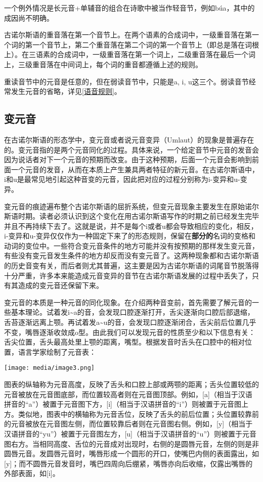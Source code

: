 一个例外情况是长元音+单辅音的组合在诗歌中被当作轻音节，例如búa，其中的成因尚不明确。

古诺尔斯语的重音落在第一个音节上。在两个语素的合成词中，一级重音落在第一个词的第一个音节上，第二个重音落在第二个词的第一个音节上（即总是落在词根上）。在三语素的合成词中，一级重音落在第一个词上，二级重音落在最后一个词上，三级重音落在中间词上，每个词的重音都遵循上述的规则。

重读音节中的元音是任意的，但在弱读音节中，只能是a, i,
u这三个。弱读音节经常发生元音的省略，详见\ref{语音规则}。

\subsection{变元音}\label{变元音}

在古诺尔斯语的形态学中，变元音或者说元音变异（Umlaut）的现象是普遍存在的。变元音指的是两个元音同化的过程。具体来说，一个给定音节中元音的发音会因为说话者对下一个元音的预期而改变。由于这种预期，后面一个元音会影响到前面一个元音的发音，从而在本质上产生兼具两者特征的新元音。在古诺尔斯语中，i和u是最常见地引起这种音变的元音，因此把对应的过程分别称为i-变异和u-变异。

变元音的痕迹遍布整个古诺尔斯语的屈折系统，但变元音现象主要发生在原始诺尔斯语时期。读者必须认识到这个变化在用古诺尔斯语写作的时期之前已经发生完毕并且不再持续下去了。这就是说，并不是每个i或者u都会导致相应的变化，相反，i-变异和u-变异仅仅作为一种固定下来了的形态规则，保留在\textbf{部分的}名词的变格和动词的变位中。一些符合变元音条件的地方可能并没有按预期的那样发生变元音，有些没有变元音发生条件的地方却反而没有变元音了。这两种现象都和古诺尔斯语的历史音变有关，而后者则尤其普遍，这主要是因为古诺尔斯语的词尾音节脱落得十分严重，许多本来能造成元音变异的音节在古诺尔斯语发展的过程中丢失了，只有其造成的变元音还保留下来。

变元音的本质是一种元音的同化现象。在介绍两种音变前，首先需要了解元音的一些基本理论。试着发i\textasciitilde a的音，会发现口腔逐渐打开，舌尖逐渐向口腔后部退缩，舌苔逐渐远离上颚。再试着发a\textasciitilde u的音，会发现口腔逐渐闭合，舌尖前后位置几乎不变，嘴唇逐渐收敛成o型。由此我们可以发现元音的性质至少和以下信息有关：舌尖位置，舌头最高处里上颚的距离，嘴型。根据发音时舌头在口腔中的相对位置，语言学家绘制了元音表：

\texttt{[image: media/image3.png]}

图表的纵轴称为元音高度，反映了舌头和口腔上部或两颚的距离；舌头位置较低的元音被放在元音图底部，而位置较高者则在元音图顶部。例如，{[}a{]}（相当于汉语拼音的``a''）被置于元音图下方，{[}i{]}（相当于汉语拼音的``i''）则被置于元音图上方。类似地，图表中的横轴称为元音舌位，反映了舌头的前后位置；头位置较靠前的元音被放在元音图左侧，而位置较靠后者则在元音图右侧。例如，{[}y{]}（相当于汉语拼音的``yu''）被置于元音图左方，{[}u{]}（相当于汉语拼音的``u''）则被置于元音图右方。当相同高度、舌位的元音成对出现时，右侧的是圆唇元音，左侧的则是非圆唇元音。发圆唇元音时，嘴唇形成一个圆形的开口，使嘴巴内侧的表面露出，如{[}y{]}；而不圆唇元音发音时，嘴巴四周向后绷紧，嘴唇亦向后收缩，仅露出嘴唇的外部表面，如{[}i{]}。

